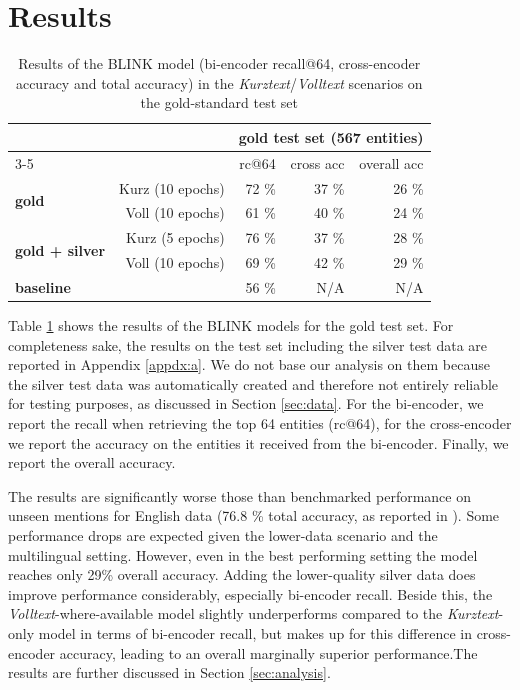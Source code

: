 \documentclass[final]{anthology-ch}
\begin{document}
\section{Results}\label{sec:results}

\begin{table}[ht]
\centering
\begin{tabular}{lrrrr}
\toprule
& & \multicolumn{3}{c}{{\bf gold test set (567 entities)}} \\
\cmidrule(lr){3-5}
& & rc@64 & cross acc & overall acc\\
\midrule
\multirow{2}{*}{\bf gold} & Kurz (10 epochs) & 72 \% & 37 \% & 26 \% \\ 
                          & Voll (10 epochs) & 61 \% & 40 \% & 24 \% \\ 
\multirow{2}{*}{\bf gold + silver} & Kurz (5 epochs) & 76 \% & 37 \% & 28 \% \\ 
                   & Voll (10 epochs) & 69 \% & 42 \% & 29 \% \\
                   \midrule
\bf baseline & & 56 \% & N/A & N/A \\ 
\bottomrule     
\end{tabular}
\caption{Results of the BLINK model (bi-encoder recall@64, cross-encoder accuracy and total accuracy) in the \textit{Kurztext}/\textit{Volltext} scenarios on the gold-standard test set}
\label{tab:results BLINK}
\end{table}

Table \ref{tab:results BLINK} shows the results of the BLINK models for the gold test set. For completeness sake, the results on the test set including the silver test data are reported in Appendix \ref{appdx:a}. We do not base our analysis on them because the silver test data was automatically created and therefore not entirely reliable for testing purposes, as discussed in Section \ref{sec:data}. For the bi-encoder, we report the recall when retrieving the top 64 entities (rc@64), for the cross-encoder we report the accuracy on the entities it received from the bi-encoder. Finally, we report the overall accuracy.

The results are significantly worse those than benchmarked performance on unseen mentions for English data (76.8 \% total accuracy, as reported in \textcite{Wu_Petroni_Josifoski_Riedel_Zettlemoyer_2020}). Some performance drops are expected given the lower-data scenario and the multilingual setting. However, even in the best performing setting the model reaches only 29\% overall accuracy. Adding the lower-quality silver data does improve performance considerably, especially bi-encoder recall.
Beside this, the  \textit{Volltext}-where-available model slightly underperforms compared to the \textit{Kurztext}-only model in terms of bi-encoder recall, but makes up for this difference in cross-encoder accuracy, leading to an overall marginally superior performance.The results are further discussed in Section \ref{sec:analysis}.
\end{document}
